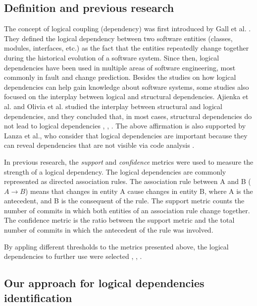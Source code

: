 \documentclass[runningheads]{comsis2}
\begin{document}
\subsection{Definition and previous research}
\label{definition_ld}
The concept of logical coupling (dependency) was first introduced by Gall et al. \cite{Gall:1998:DLC:850947.853338}. They defined the logical dependency between two software entities (classes, modules, interfaces, etc.) as the fact that the entities repeatedly change together during the historical evolution of a software system.
Since then, logical dependencies have been used in multiple areas of software engineering, most commonly in fault and change prediction.  
Besides the studies on how logical dependencies can help gain knowledge about software systems, some studies also focused on the interplay between logical and structural dependencies. Ajienka et al. and Olivia et al. studied the interplay between structural and logical dependencies, and they concluded that, in most cases, structural dependencies do not lead to logical dependencies \cite{Oliva:2011:ISL:2067853.2068086}, \cite{DBLP:conf/issre/OlivaG15}, \cite{DBLP:journals/jss/AjienkaC17}. The above affirmation is also supported by Lanza et al., who consider that logical dependencies are important because they can reveal dependencies that are not visible via code analysis \cite{inproceedings_radar_evolution}.



In previous research, the \textit{support} and \textit{confidence} metrics were used to measure the strength of a logical dependency. 
The logical dependencies are commonly represented as directed association rules. The association rule between A and B ( $A \rightarrow B$) means that changes in entity A cause changes in entity B, where A is the antecedent, and B is the consequent of the rule. 
The support metric counts the number of commits in which both entities of an association rule change together. The confidence metric is the ratio between the support metric and the total number of commits in which the antecedent of the rule was involved. 

By appling different thresholds to the metrics presented above, the logical dependencies to further use were selected \cite{DBLP:conf/issre/OlivaG15}, \cite{DBLP:journals/jss/AjienkaC17}, \cite{Zimmermann:2004:MVH:998675.999460}.


\subsection{Our approach for logical dependencies identification}
\label{current_approach}
\end{document}
